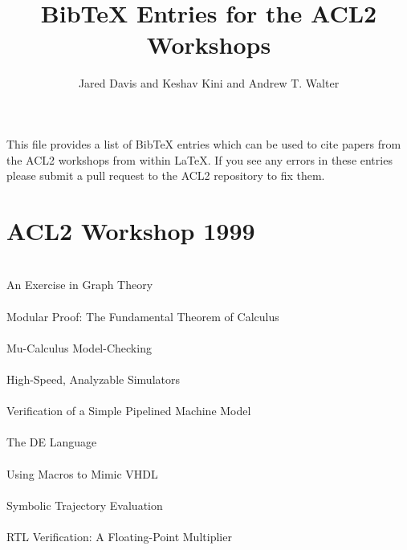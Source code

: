 \documentclass{article}
\title{BibTeX Entries for the ACL2 Workshops}
\author{Jared Davis and Keshav Kini and Andrew T. Walter}
\begin{document}
\maketitle

This file provides a list of BibTeX entries which can be used to cite papers
from the ACL2 workshops from within \LaTeX{}.  If you see any errors in these
entries please submit a pull request to the ACL2 repository to fix them.


\section{ACL2 Workshop 1999}

\cite{99-moore-graph} \\
An Exercise in Graph Theory \\

\cite{99-kaufmann-ftc} \\
Modular Proof: The Fundamental Theorem of Calculus \\

\cite{99-manolios-mu} \\
Mu-Calculus Model-Checking \\

\cite{99-greve-simulators} \\
High-Speed, Analyzable Simulators \\

\cite{99-sawada-pipelined} \\
Verification of a Simple Pipelined Machine Model \\

\cite{99-hunt-de} \\
The {DE} Language \\

\cite{99-borrione-vhdl} \\
Using Macros to Mimic {VHDL} \\

\cite{99-jamsek-ste} \\
Symbolic Trajectory Evaluation \\

\cite{99-russinoff-rtl} \\
{RTL} Verification: A Floating-Point Multiplier \\
\end{document}
